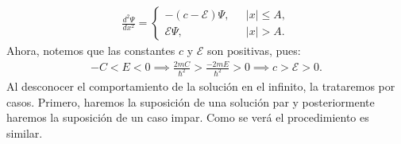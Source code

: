 \documentclass[12pt]{article}
\theoremstyle{definition}
\begin{document}
\begin{align}
        \frac{d^2\Psi}{dx^2}= 
        \left\{ \begin{array}{ll}
        -(c-\mathcal{E})\Psi,& \:\:\:  |x| \leq A,
        \\
        \mathcal{E}\Psi,& \:\:\: |x| > A.
        \end{array}
        \right.
        \label{eq:SCsimple}
\end{align}
Ahora, notemos que las constantes $c$ y $\mathcal{E}$ son positivas, pues:
\begin{align*}
    -C<E<0 \implies \frac{2mC}{\hslash^2}>\frac{-2mE}{\hslash^2}>0 \implies c>\mathcal{E}>0.
\end{align*}
Al desconocer el comportamiento de la solución en el infinito, la trataremos por casos. Primero, haremos la suposición de una solución par y posteriormente haremos la suposición de un caso impar. Como se verá el procedimiento es similar.  
\end{document}

